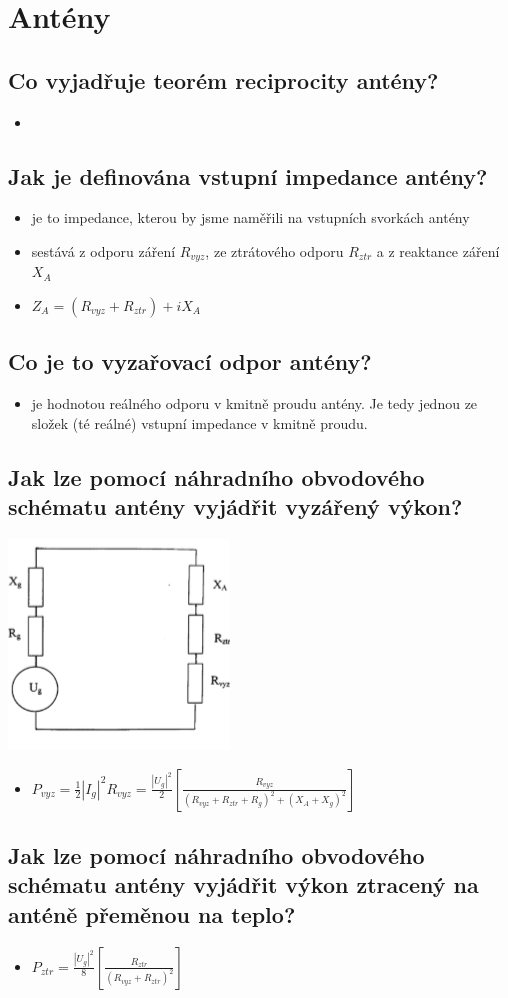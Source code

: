 \documentclass[a4paper]{article}
\begin{document}
\section{Antény}
\subsection{\textbf{Co vyjadřuje teorém reciprocity antény?}}
\begin{itemize}
	\item 
\end{itemize}
\subsection{\textbf{Jak je definována vstupní impedance antény?}}
\begin{itemize}
	\item je to impedance, kterou by jsme naměřili na vstupních svorkách antény
	\item sestává z odporu záření $R_{vyz}$, ze ztrátového odporu $R_{ztr}$ a z reaktance záření $X_A$
	\item $Z_A = (R_{vyz} + R_{ztr}) + iX_A$
\end{itemize}
\subsection{\textbf{Co je to vyzařovací odpor antény?}}
\begin{itemize}
	\item je hodnotou reálného odporu v kmitně proudu antény. Je tedy jednou ze složek (té reálné) vstupní impedance v kmitně proudu.
\end{itemize}
\subsection{\textbf{Jak lze pomocí náhradního obvodového schématu antény vyjádřit vyzářený výkon?}}
\begin{center}
\includegraphics{images/ant_nahr.png}
\end{center}
\begin{itemize}
	\item $P_{vyz} = \frac{1}{2}|I_g|^2R_{vyz}=\frac{|U_g|^2}{2}[\frac{R_{vyz}}{(R_{vyz}+R_{ztr}+R_g)^2+(X_A+X_g)^2}]$
\end{itemize}
\subsection{\textbf{Jak lze pomocí náhradního obvodového schématu antény vyjádřit výkon ztracený na anténě přeměnou na teplo?}}
\begin{itemize}
	\item $P_{ztr} = \frac{|U_g|^2}{8}[\frac{R_{ztr}}{(R_{vyz}+R_{ztr})^2}]$
\end{itemize}
\end{document}
